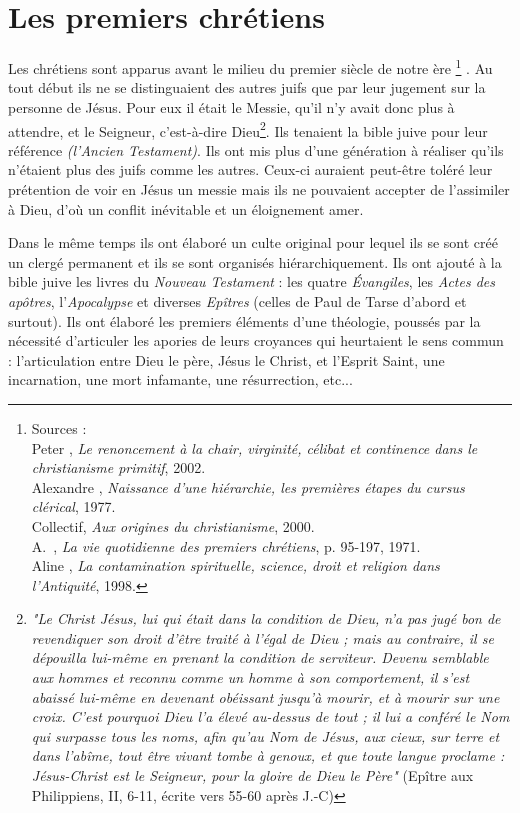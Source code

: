 


\chapter{Les premiers chrétiens}


 Les chrétiens sont apparus avant le milieu du premier siècle de notre ère%
\footnote{Sources :\\
Peter , \emph{Le renoncement à la chair, virginité, célibat et continence dans le christianisme primitif}, 2002.\\
Alexandre , \emph{Naissance d'une hiérarchie, les premières étapes du cursus clérical}, 1977.\\
Collectif, \emph{Aux origines du christianisme}, 2000.\\
A.~, \emph{La vie quotidienne des premiers chrétiens}, p. 95-197, 1971.\\
Aline , \emph{La contamination spirituelle, science, droit et religion dans l'Antiquité}, 1998.}%
. Au tout début ils ne se distinguaient des autres juifs que par leur jugement sur la personne de Jésus. Pour eux il était le Messie, qu'il n'y avait donc plus à attendre, et le Seigneur, c'est-à-dire Dieu\footnote{\emph{"Le Christ Jésus, lui qui était dans la condition de Dieu, n'a pas jugé bon de revendiquer son droit d'être traité à l'égal de Dieu ; mais au contraire, il se dépouilla lui-même en prenant la condition de serviteur. Devenu semblable aux hommes et reconnu comme un homme à son comportement, il s'est abaissé lui-même en devenant obéissant jusqu'à mourir, et à mourir sur une croix. C'est pourquoi Dieu l'a élevé au-dessus de tout ; il lui a conféré le Nom qui surpasse tous les noms, afin qu'au Nom de Jésus, aux cieux, sur terre et dans l'abîme, tout être vivant tombe à genoux, et que toute langue proclame : Jésus-Christ est le Seigneur, pour la gloire de Dieu le Père"} (Epître aux Philippiens, II, 6-11, écrite vers 55-60 après J.-C)}.
Ils tenaient la bible juive pour leur référence \emph{(l'Ancien Testament)}. Ils ont mis plus d'une génération à réaliser qu'ils n'étaient plus des juifs comme les autres. Ceux-ci auraient peut-être toléré leur prétention de voir en Jésus un messie mais ils ne pouvaient accepter de l'assimiler à Dieu, d'où un conflit inévitable et un éloignement amer.



Dans le même temps ils ont élaboré un culte original pour lequel ils se sont créé un clergé permanent et ils se sont organisés hiérarchiquement. Ils ont ajouté à la bible juive les livres du \emph{Nouveau Testament} : les quatre \emph{Évangiles}, les \emph{Actes des apôtres}, l'\emph{Apocalypse} et diverses \emph{Epîtres} (celles de Paul de Tarse d'abord et surtout). Ils ont élaboré les premiers éléments d'une théologie, poussés par la nécessité d'articuler les apories de leurs croyances qui heurtaient le sens commun : l'articulation entre Dieu le père, Jésus le Christ, et l'Esprit Saint, une incarnation, une mort infamante, une résurrection, etc... 

